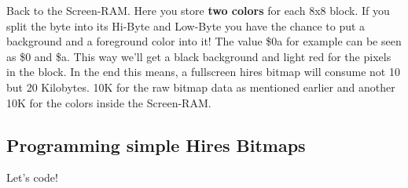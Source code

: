 Back to the Screen-RAM. Here you store \textbf{two colors} for each 8x8 block. If you split the byte into its Hi-Byte and Low-Byte you have the chance to put a background and a foreground color into it! The value \$0a for example can be seen as \$0 and \$a. This way we'll get a black background and light red for the pixels in the block. In the end this means, a fullscreen hires bitmap will consume not 10 but 20 Kilobytes. 10K for the raw bitmap data as mentioned earlier and another 10K for the colors inside the Screen-RAM.\\


\subsection*{Programming simple Hires Bitmaps}

Let's code!
 
